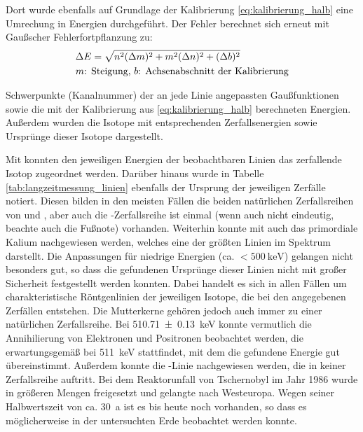\documentclass[11pt, a4paper]{article}
\numberwithin{equation}{section}
\newcommand{\cs}{\isotope[137]{Cs}}
\begin{document}
Dort wurde ebenfalls auf Grundlage der Kalibrierung \eqref{eq:kalibrierung_halb} eine Umrechung in Energien durchgeführt.
Der Fehler berechnet sich erneut mit Gaußscher Fehlerfortpflanzung zu:
\begin{align}
&\Delta E = \sqrt{n^2 (\Delta m)^2 + m^2 (\Delta n)^2 + (\Delta b)^2} \\
&\text{$m$: Steigung, $b$: Achsenabschnitt der Kalibrierung} \notag
\end{align}
\begin{table}
	\centering
	
	\caption{Schwerpunkte (Kanalnummer) der an jede Linie angepassten Gaußfunktionen sowie die mit der Kalibrierung aus \eqref{eq:kalibrierung_halb} berechneten Energien. Außerdem wurden die Isotope mit entsprechenden Zerfallsenergien sowie Ursprünge dieser Isotope dargestellt.}
	\label{tab:langzeitmessung_linien}
\end{table}
Mit \cite{gilmore} konnten den jeweiligen Energien der beobachtbaren Linien das zerfallende Isotop zugeordnet werden.
Darüber hinaus wurde in Tabelle \ref{tab:langzeitmessung_linien} ebenfalls der Ursprung der jeweiligen Zerfälle notiert.
Diesen bilden in den meisten Fällen die beiden natürlichen Zerfallsreihen von  und , aber auch die -Zerfallsreihe ist einmal (wenn auch nicht eindeutig, beachte auch die Fußnote) vorhanden.
Weiterhin konnte mit  auch das primordiale Kalium nachgewiesen werden, welches eine der größten Linien im Spektrum darstellt.
Die Anpassungen für niedrige Energien (ca. $<\SI{500}{\kilo\electronvolt}$) gelangen nicht besonders gut, so dass die gefundenen Ursprünge dieser Linien nicht mit großer Sicherheit festgestellt werden konnten.
Dabei handelt es sich in allen Fällen um charakteristische Röntgenlinien der jeweiligen Isotope, die bei den angegebenen Zerfällen entstehen.
Die Mutterkerne gehören jedoch auch immer zu einer natürlichen Zerfallsreihe.
Bei \SI{510.71+-0.13}{\kilo\electronvolt} konnte vermutlich die Annihilierung von Elektronen und Positronen beobachtet werden, die erwartungsgemäß bei \SI{511}{\kilo\electronvolt} stattfindet, mit dem die gefundene Energie gut übereinstimmt.
Außerdem konnte die \cs{}-Linie nachgewiesen werden, die in keiner Zerfallsreihe auftritt.
Bei dem Reaktorunfall von Tschernobyl im Jahr 1986 wurde \cs{} in größeren Mengen freigesetzt und gelangte nach Westeuropa.
Wegen seiner Halbwertszeit von ca. \SI{30}{a} ist es bis heute noch vorhanden, so dass es möglicherweise in der untersuchten Erde beobachtet werden konnte. 
\end{document}
